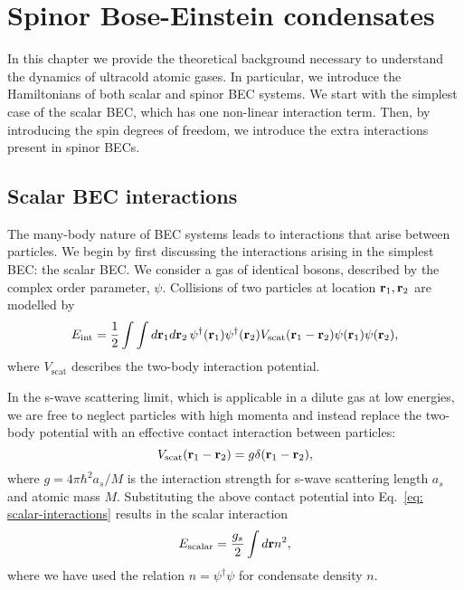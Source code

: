 \chapter{Spinor Bose-Einstein condensates}

In this chapter we provide the theoretical background necessary to understand
the dynamics of ultracold atomic gases.
In particular, we introduce the Hamiltonians of both scalar and spinor BEC
systems.
We start with the simplest case of the scalar BEC, which has one non-linear
interaction term.
Then, by introducing the spin degrees of freedom, we introduce the extra
interactions present in spinor BECs.

\section{Scalar BEC interactions}
The many-body nature of BEC systems leads to interactions that arise between
particles.
We begin by first discussing the interactions arising in the simplest BEC\@: the
scalar BEC\@.
We consider a gas of identical bosons, described by the complex order parameter,
\(\psi \).
Collisions of two particles at location \(\vb{r}_1, \vb{r}_2\) are modelled by
\begin{equation}\label{eq: scalar-interactions}
    E_\mathrm{int} = \frac{1}{2}\int \int d\vb{r}_1d\vb{r}_2\,
    \psi^\dagger(\vb{r}_1)\psi^\dagger(\vb{r}_2)
    V_\mathrm{scat}(\vb{r}_1-\vb{r}_2)\psi(\vb{r}_1)\psi(\vb{r}_2),
\end{equation}
where \(V_\mathrm{scat}\) describes the two-body interaction potential.

In the s-wave scattering limit, which is applicable in a dilute gas at low
energies, we are free to neglect particles with high momenta
and instead replace the two-body potential with an effective contact interaction
between particles:
\begin{equation}
    V_\mathrm{scat}(\vb{r}_1 - \vb{r}_2) = g\delta(\vb{r}_1 - \vb{r}_2),
\end{equation}
where \(g=4\pi\hbar^2a_s/M\) is the interaction strength for s-wave
scattering length \(a_s\) and atomic mass \(M\).
Substituting the above contact potential into
Eq.~\eqref{eq: scalar-interactions} results in the scalar interaction
\begin{equation}
    E_\mathrm{scalar} = \frac{g_s}{2}\int d\vb{r} n^2,
\end{equation}
where we have used the relation \(n = \psi^\dagger \psi \) for condensate
density \(n\).

